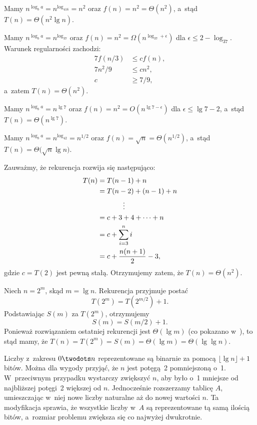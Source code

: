 \subproblem %
Mamy $n^{\log_ba}=n^{\log_416}=n^2$ oraz $f(n)=n^2=\Theta(n^2)$, a~stąd $T(n)=\Theta(n^2\lg n)$.

\subproblem %
Mamy $n^{\log_ba}=n^{\log_37}$ oraz $f(n)=n^2=\Omega(n^{\log_37+\epsilon})$ dla $\epsilon\le2-\log_37$. Warunek regularności zachodzi:
\begin{align*}
	7f(n/3) &\le cf(n), \\
	7n^2\!/9 &\le cn^2, \\
	c &\ge 7/9,
\end{align*}
a~zatem $T(n)=\Theta(n^2)$.

\subproblem %
Mamy $n^{\log_ba}=n^{\lg7}$ oraz $f(n)=n^2=O(n^{\lg7-\epsilon})$ dla $\epsilon\le\lg7-2$, a~stąd $T(n)=\Theta(n^{\lg7})$.

\subproblem %
Mamy $n^{\log_ba}=n^{\log_42}=n^{1/2}$ oraz $f(n)=\sqrt{n}=\Theta(n^{1/2})$, a~stąd $T(n)=\Theta\bigl(\!\sqrt{n}\lg n\bigr)$.

\subproblem %
Zauważmy, że rekurencja rozwija się następująco:
\begin{align*}
	T(n) &= T(n-1)+n \\
	&= T(n-2)+(n-1)+n \\
	&\hspace{.5in}\vdots \\
	&= c+3+4+\dots+n \\
	&= c+\sum_{i=3}^ni \\
	&= c+\frac{n(n+1)}{2}-3,
\end{align*}
gdzie $c=T(2)$ jest pewną stałą. Otrzymujemy zatem, że $T(n)=\Theta(n^2)$.

\subproblem %
Niech $n=2^m$, skąd $m=\lg n$. Rekurencja przyjmuje postać
\[
	T(2^m) = T(2^{m/2})+1.
\]
Podstawiając $S(m)$ za $T(2^m)$, otrzymujemy
\[
	S(m) = S(m/2)+1.
\]
Ponieważ rozwiązaniem ostatniej rekurencji jest $\Theta(\lg m)$ (co pokazano w~), to stąd mamy, że $T(n)=T(2^m)=S(m)=\Theta(\lg m)=\Theta(\lg\lg n)$.

Liczby z~zakresu $0\twodots n$ reprezentowane są binarnie za pomocą $\lfloor\lg n\rfloor+1$ bitów. Można dla wygody przyjąć, że $n$ jest potęgą~2 pomniejszoną o~1. W~przeciwnym przypadku wystarczy zwiększyć $n$, aby było o~1 mniejsze od najbliższej potęgi~2 większej od $n$. Jednocześnie rozszerzamy tablicę $A$, umieszczając w~niej nowe liczby naturalne aż do nowej wartości $n$. Ta modyfikacja sprawia, że wszystkie liczby w~$A$ są reprezentowane tą samą ilością bitów, a~rozmiar problemu zwiększa się co najwyżej dwukrotnie.

